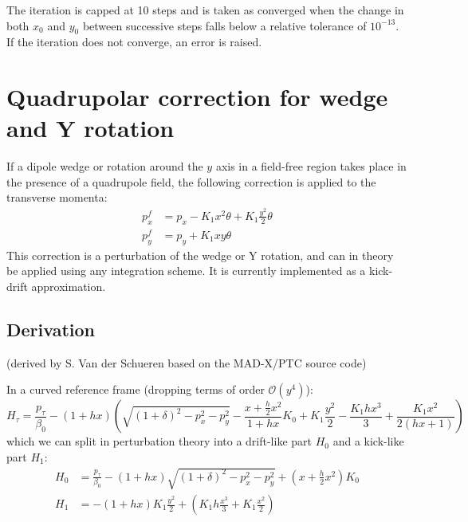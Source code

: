 The iteration is capped at 10 steps and is taken as converged when the change in both $x_0$ and
$y_0$ between successive steps falls below a relative tolerance of $10^{-13}$. If the iteration
does not converge, an error is raised.

\section{Quadrupolar correction for wedge and Y rotation}

If a dipole wedge or rotation around the $y$ axis in a field-free region
takes place in the presence of a quadrupole field,
the following correction is applied to the transverse momenta:
\begin{align}
p_x^f &= p_x - K_1 x^2 \theta + K_1 \frac{y^2}{2} \theta
\label{eq:pxf}
\\
p_y^f &= p_y + K_1 x y \theta
\label{eq:pyf}
\end{align}
This correction is a perturbation of the wedge or Y rotation, and can in theory be applied using any integration scheme. It is currently implemented as a kick-drift approximation.

\subsection*{Derivation}
(derived by S. Van der Schueren based on the MAD-X/PTC \cite{madsite} source code)

In a curved reference frame (dropping terms of order $\mathcal{O}(y^4)$):
\begin{equation}
H_\tau = \frac{p_\tau}{\beta_0} - (1 + h x)
\left(
\sqrt{(1+\delta)^2 - p_x^2 - p_y^2}
- \frac{x + \frac{h}{2} x^2}{1 + h x} K_0 + K_1 \frac{y^2}{2} - \frac{K_1 h x^3}{3} + \frac{K_1 x^2}{2(hx+1)}
\right)
\label{eq:Htau}
\end{equation}
which we can split in perturbation theory into a drift-like part $H_0$ and a kick-like part $H_1$:
\begin{align}
H_0 &= \frac{p_\tau}{\beta_0} - (1 + h x)\sqrt{(1+\delta)^2 - p_x^2 - p_y^2} + \left( x + \frac{h}{2}x^2 \right) K_0
\label{eq:H1}
\\
H_1 &= -(1 + h x) K_1 \frac{y^2}{2} + \left( K_1 h \frac{x^3}{3} + K_1 \frac{x^2}{2} \right)
\label{eq:H2}
\end{align}

